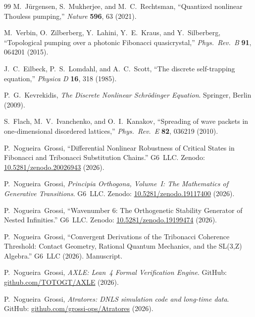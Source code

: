 \documentclass[12pt,a4paper]{article}
\begin{document}
\begin{thebibliography}{99}
M.~J\"{u}rgensen, S.~Mukherjee, and M.~C.~Rechtsman,
``Quantized nonlinear Thouless pumping,''
\textit{Nature} \textbf{596}, 63 (2021).

M.~Verbin, O.~Zilberberg, Y.~Lahini, Y.~E.~Kraus, and Y.~Silberberg,
``Topological pumping over a photonic Fibonacci quasicrystal,''
\textit{Phys.\ Rev.\ B} \textbf{91}, 064201 (2015).

J.~C.~Eilbeck, P.~S.~Lomdahl, and A.~C.~Scott,
``The discrete self-trapping equation,''
\textit{Physica D} \textbf{16}, 318 (1985).

P.~G.~Kevrekidis,
\textit{The Discrete Nonlinear Schr\"{o}dinger Equation}.
Springer, Berlin (2009).

S.~Flach, M.~V.~Ivanchenko, and O.~I.~Kanakov,
``Spreading of wave packets in one-dimensional disordered lattices,''
\textit{Phys.\ Rev.\ E} \textbf{82}, 036219 (2010).

P.~Nogueira~Grossi,
``Differential Nonlinear Robustness of Critical States in Fibonacci and
Tribonacci Substitution Chains.''
G6~LLC. Zenodo: \href{https://doi.org/10.5281/zenodo.20026943}{10.5281/zenodo.20026943} (2026).

P.~Nogueira~Grossi,
\textit{Principia Orthogona, Volume~I: The Mathematics of Generative Transitions}.
G6~LLC. Zenodo: \href{https://doi.org/10.5281/zenodo.19117400}{10.5281/zenodo.19117400} (2026).

P.~Nogueira~Grossi,
``Wavenumber 6: The Orthogenetic Stability Generator of Nested Infinities.''
G6~LLC. Zenodo: \href{https://doi.org/10.5281/zenodo.19199474}{10.5281/zenodo.19199474} (2026).

P.~Nogueira~Grossi,
``Convergent Derivations of the Tribonacci Coherence Threshold:
Contact Geometry, Rational Quantum Mechanics, and the SL(3,Z) Algebra.''
G6~LLC (2026). Manuscript.

P.~Nogueira~Grossi,
\textit{AXLE: Lean~4 Formal Verification Engine}.
GitHub: \href{https://github.com/TOTOGT/AXLE}{github.com/TOTOGT/AXLE} (2026).

P.~Nogueira~Grossi,
\textit{Atratores: DNLS simulation code and long-time data}.
GitHub: \href{https://github.com/grossi-ops/Atratores}{github.com/grossi-ops/Atratores} (2026).

\end{thebibliography}
\end{document}

